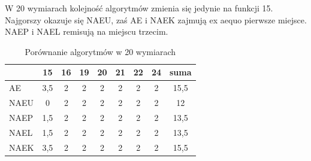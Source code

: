 \documentclass[12pt, a4paper]{article}
\begin{document}
W 20 wymiarach kolejność algorytmów zmienia się jedynie na funkcji 15. Najgorszy okazuje się
NAEU, zaś AE i NAEK zajmują ex aequo pierwsze miejsce. NAEP i NAEL remisują na miejscu trzecim.

\begin{table}[H]
\centering
\begin{tabular}{ l | c | c | c | c | c | c | c | c}
         & 15  & 16 & 19 & 20 & 21 & 22 & 24 & suma   \\ \hline
AE       & 3,5 & 2  & 2  & 2  & 2  & 2  & 2  & 15,5   \\ 
NAEU     & 0   & 2  & 2  & 2  & 2  & 2  & 2  & 12     \\ 
NAEP     & 1,5 & 2  & 2  & 2  & 2  & 2  & 2  & 13,5   \\ 
NAEL     & 1,5 & 2  & 2  & 2  & 2  & 2  & 2  & 13,5   \\
NAEK     & 3,5 & 2  & 2  & 2  & 2  & 2  & 2  & 15,5   \\ 
\end{tabular}
\caption{Porównanie algorytmów w 20 wymiarach}
\label{table:total}
\end{table}
\end{document}
